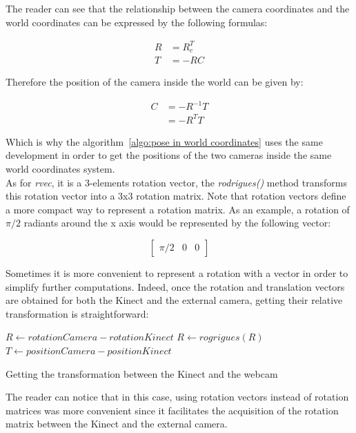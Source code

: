 The reader can see that the relationship between the camera coordinates and the world coordinates can be expressed by the following formulas:

\begin{align}
R  &= R_c^T \\
T &= -RC 
\end{align}

Therefore the position of the camera inside the world can be given by:

\begin{align}
C &= -R^{-1}T\\
  &= -R^TT 
\end{align}

Which is why the algorithm~\ref{algo:pose in world coordinates} uses the same development in order to get the positions of the two cameras inside the same world coordinates system. \\

As for \textit{rvec}, it is a 3-elements rotation vector, the \textit{rodrigues()} method transforms this rotation vector into a 3x3 rotation matrix. Note that rotation vectors define a more compact way to represent a rotation matrix. As an example, a rotation of $\pi/2$ radiants around the x axis would be represented by the following vector:

\begin{equation}
\begin{bmatrix} 
\pi/2 & 0 & 0 
\end{bmatrix}
\end{equation}


Sometimes it is more convenient to represent a rotation with a vector in order to simplify further computations. Indeed, once the rotation and translation vectors are obtained for both the Kinect and the external camera, getting their relative transformation is straightforward:

\begin{algorithm}[H]
  \begin{algorithmic}
    \State $R \gets rotationCamera - rotationKinect$
    \State $R \gets rogrigues(R)$
    \State $T \gets positionCamera - positionKinect$ 
  \caption{Getting the transformation between the Kinect and the webcam}
  \end{algorithmic}
\end{algorithm}

The reader can notice that in this case, using rotation vectors instead of rotation matrices was more convenient since it facilitates the acquisition of the rotation matrix between the Kinect and the external camera.\\

